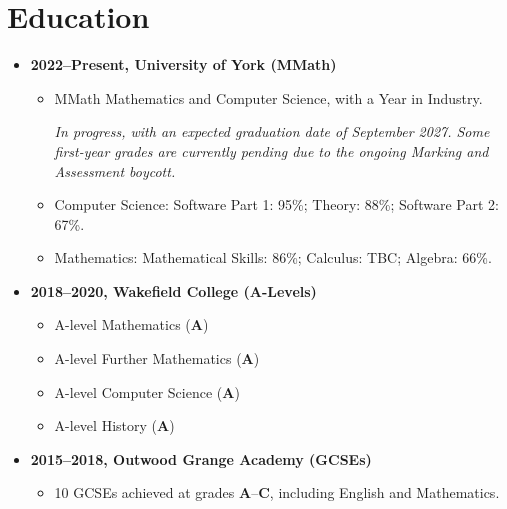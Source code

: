 \documentclass{article}
\begin{document}
\section{Education}
\begin{itemize}
    \item \textbf{2022--Present, University of York (MMath)}
    \begin{itemize}
        \item MMath Mathematics and Computer Science, with a Year in
            Industry.\par\emph{In progress, with an expected graduation date of
            September 2027. Some first-year grades are currently pending due to
            the ongoing Marking and Assessment boycott.}
        \item Computer Science: Software Part 1: 95\%; Theory: 88\%; Software
            Part 2: 67\%.
        \item Mathematics: Mathematical Skills: 86\%; Calculus: TBC;
            Algebra: 66\%.
    \end{itemize}
    \item \textbf{2018--2020, Wakefield College (A-Levels)}
    \begin{itemize}
        \item A-level Mathematics (\textbf{A})
        \item A-level Further Mathematics (\textbf{A})
        \item A-level Computer Science (\textbf{A})
        \item A-level History (\textbf{A})
    \end{itemize}
    \item \textbf{2015--2018, Outwood Grange Academy (GCSEs)}
    \begin{itemize}
        \item 10 GCSEs achieved at grades \textbf{A}--\textbf{C}, including
            English and Mathematics.
    \end{itemize}
\end{itemize}
\end{document}
